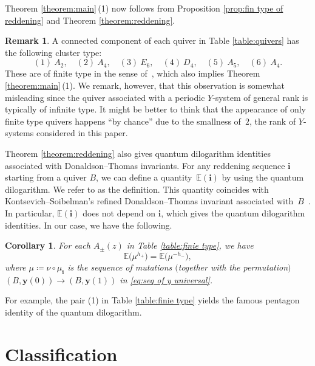 \documentclass[10pt,a4paper]{amsart}
\numberwithin{equation}{section}
\newtheorem{Corollary}[Theorem]{Corollary}
\theoremstyle{definition}
\newtheorem{Remark}[Theorem]{Remark}
\begin{document}
Theorem \ref{theorem:main}\,(1) now follows from Proposition \ref{prop:fin type of reddening} and Theorem \ref{theorem:reddening}.

\begin{Remark}
 A connected component of each quiver in Table \ref{table:quivers} has the following cluster type:
\[
 (1) \ A_2, \quad (2) \ A_4, \quad (3) \ E_6, \quad (4) \ D_4, \quad (5) \ A_5, \quad (6) \ A_4.
\]
 These are of finite type in the sense of~\cite{FZ2}, which also implies Theorem \ref{theorem:main}\,(1).
 We remark, however, that this observation is somewhat misleading since the quiver associated with
 a periodic $Y$-system of general rank is typically of infinite type.
 It might be better to think that the appearance of only finite type quivers happens ``by chance''
 due to the smallness of~$2$, the rank of $Y$-systems considered in this paper.
\end{Remark}

Theorem \ref{theorem:reddening} also gives quantum dilogarithm identities
associated with Donaldson--Thomas invariants.
For any reddening sequence $\boldsymbol{i}$ starting from a quiver $B$, we can define
a quantity~$\mathbb{E}(\boldsymbol{i})$ by using the quantum dilogarithm.
We refer to \cite[Remark 6.6]{keller12} as the definition.
This quantity coincides with Kontsevich--Soibelman's refined
Donaldson--Thomas invariant associated with~$B$~\cite{keller12, Nagao10}.
In particular, $\mathbb{E}(\boldsymbol{i})$ does not depend on $\boldsymbol{i}$,
which gives the quantum dilogarithm identities. In our case, we have the following.

\begin{Corollary}\label{cor:q-dilog identity}
 For each $A_\pm (z)$ in Table {\rm\ref{table:finie type}},
 we have
 \begin{equation*}
 \mathbb{E}\bigl(\mu^{h_+}\bigr) = \mathbb{E}\bigl(\mu^{- h_-}\bigr),
 \end{equation*}
 where $\mu \coloneqq \nu \circ \mu_{\boldsymbol{i}}$ is the sequence of mutations $($together with the permutation$)$
 $(B, \boldsymbol{y}(0)) \to (B, \boldsymbol{y}(1))$ in \eqref{eq:seq of y universal}.
\end{Corollary}

For example, the pair (1) in Table \ref{table:finie type} yields
the famous pentagon identity of the quantum dilogarithm.


\section{Classification}
\end{document}
